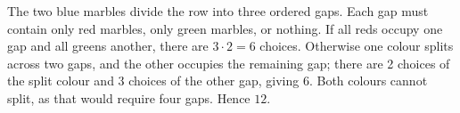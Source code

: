 The two blue marbles divide the row into three ordered gaps. Each gap must contain only red marbles, only green marbles, or nothing. If all reds occupy one gap and all greens another, there are $3\cdot2=6$ choices. Otherwise one colour splits across two gaps, and the other occupies the remaining gap; there are 2 choices of the split colour and 3 choices of the other gap, giving 6. Both colours cannot split, as that would require four gaps. Hence $\boxed{12}$.

